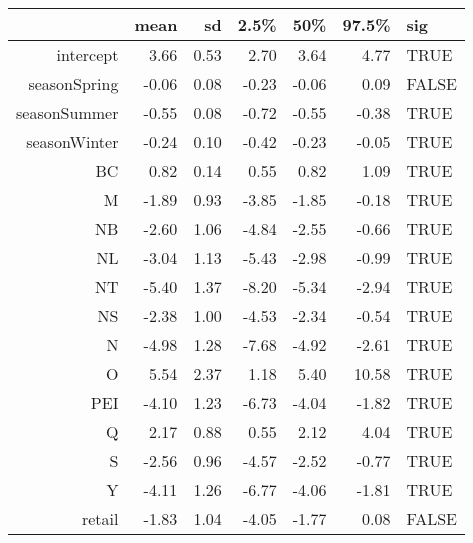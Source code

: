\begin{table}[ht]
\centering
\begin{tabular}{rrrrrrl}
  \hline
 & mean & sd & 2.5\% & 50\% & 97.5\% & sig \\ 
  \hline
intercept & 3.66 & 0.53 & 2.70 & 3.64 & 4.77 & TRUE \\ 
  seasonSpring & -0.06 & 0.08 & -0.23 & -0.06 & 0.09 & FALSE \\ 
  seasonSummer & -0.55 & 0.08 & -0.72 & -0.55 & -0.38 & TRUE \\ 
  seasonWinter & -0.24 & 0.10 & -0.42 & -0.23 & -0.05 & TRUE \\ 
  BC & 0.82 & 0.14 & 0.55 & 0.82 & 1.09 & TRUE \\ 
  M & -1.89 & 0.93 & -3.85 & -1.85 & -0.18 & TRUE \\ 
  NB & -2.60 & 1.06 & -4.84 & -2.55 & -0.66 & TRUE \\ 
  NL & -3.04 & 1.13 & -5.43 & -2.98 & -0.99 & TRUE \\ 
  NT & -5.40 & 1.37 & -8.20 & -5.34 & -2.94 & TRUE \\ 
  NS & -2.38 & 1.00 & -4.53 & -2.34 & -0.54 & TRUE \\ 
  N & -4.98 & 1.28 & -7.68 & -4.92 & -2.61 & TRUE \\ 
  O & 5.54 & 2.37 & 1.18 & 5.40 & 10.58 & TRUE \\ 
  PEI & -4.10 & 1.23 & -6.73 & -4.04 & -1.82 & TRUE \\ 
  Q & 2.17 & 0.88 & 0.55 & 2.12 & 4.04 & TRUE \\ 
  S & -2.56 & 0.96 & -4.57 & -2.52 & -0.77 & TRUE \\ 
  Y & -4.11 & 1.26 & -6.77 & -4.06 & -1.81 & TRUE \\ 
  retail & -1.83 & 1.04 & -4.05 & -1.77 & 0.08 & FALSE \\ 
   \hline
\end{tabular}
\end{table}

